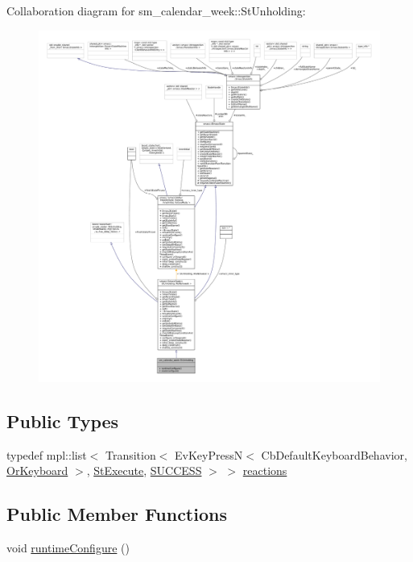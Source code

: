 Collaboration diagram for sm\+\_\+calendar\+\_\+week\+:\+:St\+Unholding\+:
\nopagebreak
\begin{figure}[H]
\begin{center}
\leavevmode
\includegraphics[width=350pt]{structsm__calendar__week_1_1StUnholding__coll__graph}
\end{center}
\end{figure}
\subsection*{Public Types}
\begin{DoxyCompactItemize}
\item 
typedef mpl\+::list$<$ Transition$<$ Ev\+Key\+PressN$<$ Cb\+Default\+Keyboard\+Behavior, \hyperlink{classsm__calendar__week_1_1OrKeyboard}{Or\+Keyboard} $>$, \hyperlink{structsm__calendar__week_1_1StExecute}{St\+Execute}, \hyperlink{classSUCCESS}{S\+U\+C\+C\+E\+SS} $>$ $>$ \hyperlink{structsm__calendar__week_1_1StUnholding_a00908bd0fd131a9bf763bdf90cc651d9}{reactions}
\end{DoxyCompactItemize}
\subsection*{Public Member Functions}
\begin{DoxyCompactItemize}
\item 
void \hyperlink{structsm__calendar__week_1_1StUnholding_ae25fc16dc1d8c88daaf1544331b5fd5c}{runtime\+Configure} ()
\end{DoxyCompactItemize}
